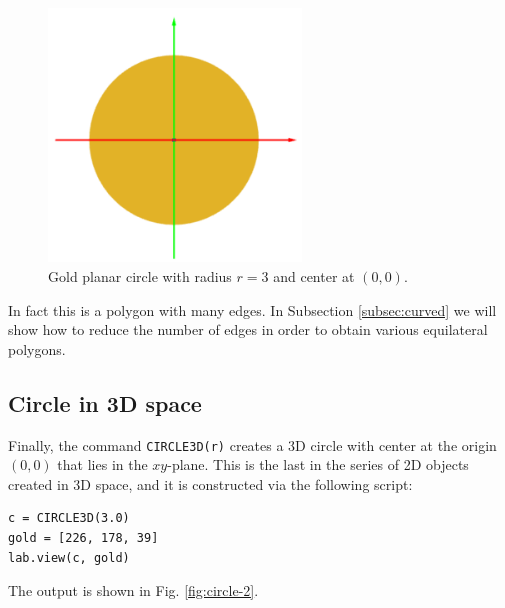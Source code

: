 \begin{figure}[!ht]
\begin{center}
\includegraphics[width=0.6\textwidth]{img/circle-1.png}
\end{center}
\vspace{-4mm}
\caption{Gold planar circle with radius $r = 3$ and center at $(0, 0)$.}
\label{fig:circle-1}
\end{figure}
\noindent
In fact this is a polygon with many edges. In Subsection \ref{subsec:curved} we will show how to 
reduce the number of edges in order to obtain various equilateral polygons.

\subsection{Circle in 3D space}

Finally, the command {\tt CIRCLE3D(r)}
creates a 3D circle with center at the origin $(0, 0)$ that lies 
in the $xy$-plane. This is the last in the series of 2D objects 
created in 3D space, and it is constructed via the following 
script:\\

\begin{bbox}
\begin{verbatim}
c = CIRCLE3D(3.0)
gold = [226, 178, 39]
lab.view(c, gold)
\end{verbatim}
\end{bbox}
\vspace{6mm}

\noindent
The output is shown in Fig. \ref{fig:circle-2}.
\newpage

